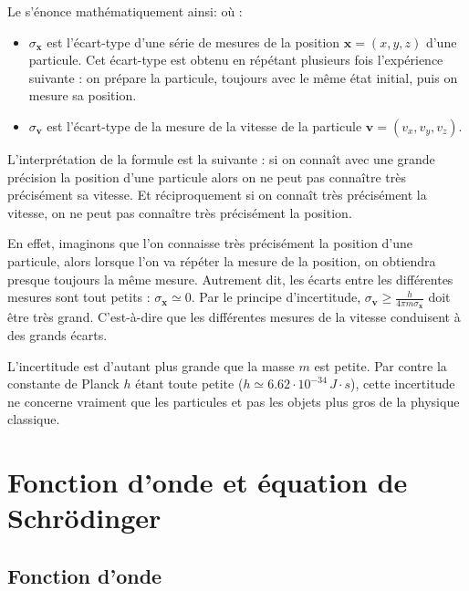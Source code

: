 \documentclass[11pt,class=report,crop=false]{standalone}
\begin{document}
Le  s'énonce mathématiquement ainsi:
où :
\begin{itemize}
  \item $\sigma_{\mathbf x}$ est l'écart-type d'une série de mesures de la position $\mathbf x = (x,y,z)$ d'une particule. Cet écart-type est obtenu en répétant plusieurs fois l'expérience suivante : on prépare la particule, toujours avec le même état initial, puis on mesure sa position.

  \item $\sigma_{\mathbf v}$ est l'écart-type de la mesure de la vitesse de la particule $\mathbf v = (v_x,v_y,v_z)$.
\end{itemize}

L'interprétation de la formule est la suivante : si on connaît avec une grande précision la position d'une particule alors on ne peut pas connaître très précisément sa vitesse. Et réciproquement si on connaît très précisément la vitesse, on ne peut pas connaître très précisément la position. 

En effet, imaginons que l'on connaisse très précisément la position d'une particule,
alors lorsque l'on va répéter la mesure de la position, on obtiendra presque toujours la même mesure. Autrement dit, les écarts entre les différentes mesures sont tout petits : $\sigma_{\mathbf x} \simeq 0$. Par le principe d'incertitude,
$\sigma_{\mathbf v} \ge \frac{h}{4\pi m\sigma_{\mathbf x}}$
doit être très grand. C'est-à-dire que les différentes mesures de la vitesse conduisent à des grands écarts.

L'incertitude est d'autant plus grande que la masse $m$ est petite. Par contre la constante de Planck $h$ étant toute petite ($h \simeq 6.62 \cdot 10^{-34} \, J\cdot s$), cette incertitude ne concerne vraiment que les particules et pas les objets plus gros de la physique classique.


\section{Fonction d'onde et équation de Schrödinger}

\subsection{Fonction d'onde}
\end{document}
